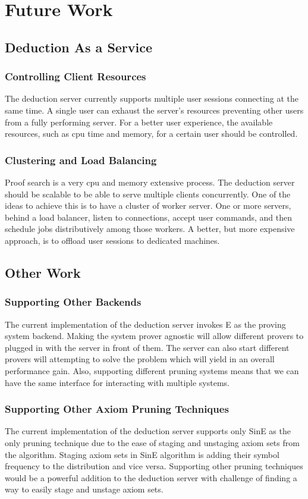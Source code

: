 \chapter{Future Work}
\label{chap:todo}

\section{Deduction As a Service}

\subsection{Controlling Client Resources}
The deduction server currently supports multiple user sessions connecting at the same time. A single user can exhaust the server's resources preventing other users from a fully performing server. For a better user experience, the available resources, such as \ac{cpu} time and memory, for a certain user should be controlled.

\subsection{Clustering and Load Balancing}
Proof search is a very \ac{cpu} and memory extensive process. The deduction server should be scalable to be able to serve multiple clients concurrently. One of the ideas to achieve this is to have a cluster of worker server. One or more servers, behind a load balancer, listen to connections, accept user commands, and then schedule jobs distributively among those workers. A better, but more expensive approach, is to offload user sessions to dedicated machines.


\section{Other Work}
\subsection{Supporting Other Backends}
The current implementation of the deduction server invokes E as the proving system backend. Making the system prover agnostic will allow different provers to plugged in with the server in front of them. The server can also start different provers will attempting to solve the problem which will yield in an overall performance gain. Also, supporting different pruning systems means that we can have the same interface for interacting with multiple systems.

\subsection{Supporting Other Axiom Pruning Techniques}
The current implementation of the deduction server supports only SinE as the only pruning technique due to the ease of staging and unstaging axiom sets from the algorithm. Staging axiom sets in SinE algorithm is adding their symbol frequency to the distribution and vice versa. Supporting other pruning techniques would be a powerful addition to the deduction server with challenge of finding a way to easily stage and unstage axiom sets.

